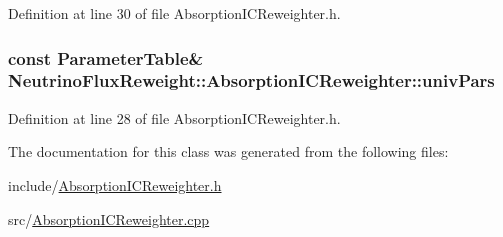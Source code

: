 Definition at line 30 of file Absorption\-I\-C\-Reweighter.\-h.

\hypertarget{class_neutrino_flux_reweight_1_1_absorption_i_c_reweighter_a76db51ee33303841ac96b51a71d9e193}{
\subsubsection[{univ\-Pars}]{\setlength{\rightskip}{0pt plus 5cm}const {\bf Parameter\-Table}\& Neutrino\-Flux\-Reweight\-::\-Absorption\-I\-C\-Reweighter\-::univ\-Pars}}\label{class_neutrino_flux_reweight_1_1_absorption_i_c_reweighter_a76db51ee33303841ac96b51a71d9e193}


Definition at line 28 of file Absorption\-I\-C\-Reweighter.\-h.



The documentation for this class was generated from the following files\-:\begin{DoxyCompactItemize}
\item 
include/\hyperlink{_absorption_i_c_reweighter_8h}{Absorption\-I\-C\-Reweighter.\-h}\item 
src/\hyperlink{_absorption_i_c_reweighter_8cpp}{Absorption\-I\-C\-Reweighter.\-cpp}\end{DoxyCompactItemize}
